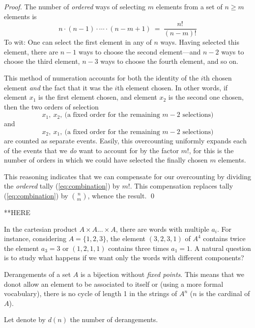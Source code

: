 \begin{proof}
The number of {\em ordered} ways of selecting $m$ elements from a set of $n \geq m$
elements is 
\begin{equation}
\label{eq:combination}
n \cdot (n-1) \cdot \cdots \cdot (n-m+1) \ = \ \frac{n!}{(n-m)!}
\end{equation}
To wit: One can select the first element in any of $n$ ways.  Having selected this element,
there are $n-1$ ways to choose the second element---and $n-2$ ways to choose the third
element, $n-3$ ways to choose the fourth element, and so on.

This method of numeration accounts for both the identity of the $i$th chosen element 
{\em and} the fact that it was the $i$th element chosen.  In other words, if element $x_1$
is the first element chosen,
and element $x_2$ is the second one chosen, then the two orders of selection
\[ x_1, \ x_2, \ \mbox{(a fixed order for the remaining $m-2$ selections)} \]
and 
\[ x_2, \ x_1, \ \mbox{(a fixed order for the remaining $m-2$ selections)} \]
are counted as separate events.  Easily, this overcounting uniformly expands each of the
events that we {\em do} want to account for by the factor $m!$, for this is the number of orders 
in which we could have selected the finally chosen $m$ elements.
 
This reasoning indicates that we can compensate for our overcounting by dividing the 
{\em ordered} tally (\ref{eq:combination}) by $m!$.  This compensation replaces tally
(\ref{eq:combination}) by $\displaystyle {n \choose m}$, whence the result.  \qed
\end{proof}

\bigskip


**HERE

In the cartesian product  $A \times A ... \times A$, there are words with multiple $a_i$.
For instance, considering $A=\{ 1,2,3 \}$, the element $(3,2,3,1)$ of $A^4$ contains twice the element $a_3=3$ 
or $(1,2,1,1)$ contains three times $a_1=1$. 
A natural question is to study what happens if we want only the words with different components?


Derangements of a set $A$ is a bijection without \textit{fixed points}.
This means that we donot allow an element to be associated to itself
or (using a more formal vocabulary), there is no cycle of length 1 in the strings of $A^n$
($n$ is the cardinal of $A$).

Let denote by $d(n)$ the number of derangements.
\medskip

